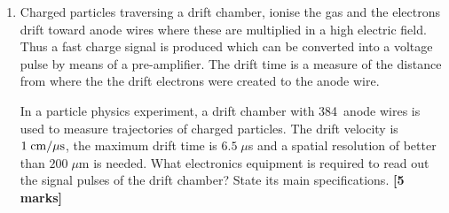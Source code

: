 \begin{enumerate}
%
\hfill {\bf [2 marks]}\\

\item Charged particles traversing a drift chamber, ionise the gas and the electrons drift toward anode wires where these are multiplied in a high electric field. Thus a fast charge signal is produced which can be converted into a voltage pulse by means of a pre-amplifier. 
The drift time is a measure of the distance from where the the drift electrons were created to the anode wire.

In a particle physics experiment, a drift chamber with 384~anode wires is used to measure trajectories of charged particles. 
The drift velocity is $1\; {\rm cm/\mu s}$, the maximum drift time is $6.5 \; \mu$s
and  a spatial resolution of  better than $200\; \mu$m is needed.
What electronics equipment is required to read out the signal pulses of the drift chamber? State its main specifications.
\hfill {\bf [5 marks]}\\


\end{enumerate}
